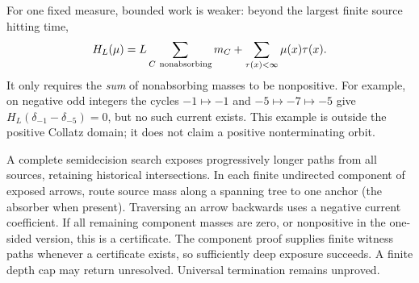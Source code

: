 \documentclass[11pt]{article}
\begin{document}
For one fixed measure, bounded work is weaker: beyond the largest finite
source hitting time,
\[
H_L(\mu)=L\sum_{C\ {\rm nonabsorbing}}m_C+
          \sum_{\tau(x)<\infty}\mu(x)\tau(x).
\]
It only requires the \emph{sum} of nonabsorbing masses to be nonpositive.
For example, on negative odd integers the cycles $-1\mapsto-1$ and
$-5\mapsto-7\mapsto-5$ give $H_L(\delta_{-1}-\delta_{-5})=0$,
but no such current exists. This example is outside the positive Collatz
domain; it does not claim a positive nonterminating orbit.

A complete semidecision search exposes progressively longer paths from all
sources, retaining historical intersections. In each finite undirected
component of exposed arrows, route source mass along a spanning tree to
one anchor (the absorber when present). Traversing an arrow backwards
uses a negative current coefficient. If all remaining component masses
are zero, or nonpositive in the one-sided version, this is a certificate.
The component proof supplies finite witness paths whenever a certificate
exists, so sufficiently deep exposure succeeds. A finite depth cap may
return unresolved. Universal termination remains unproved.
\end{document}
